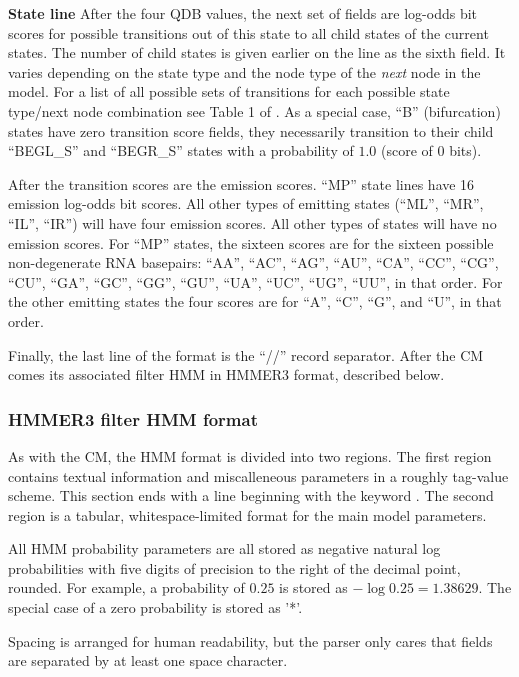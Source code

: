 \begin{sreitems}{\textbf{State line}}
  After the four QDB values, the next set of fields are log-odds bit
  scores for possible transitions out of this state to all child
  states of the current states. The number of child states is given
  earlier on the line as the sixth field. It varies depending on the
  state type and the node type of the \emph{next} node in the model.
  For a list of all possible sets of transitions for each possible
  state type/next node combination see Table 1 of
  \citep{NawrockiEddy07}. As a special case, ``B'' (bifurcation) states
  have zero transition score fields, they necessarily transition to
  their child ``BEGL\_S'' and ``BEGR\_S'' states with a probability of
  $1.0$ (score of $0$ bits).

  After the transition scores are the emission scores. 
  ``MP'' state lines have 16 emission log-odds bit scores. All other
  types of emitting states (``ML'', ``MR'', ``IL'', ``IR'') will have
  four emission scores. All other types of states will have no
  emission scores. For ``MP'' states, the sixteen scores are for the
  sixteen possible non-degenerate RNA basepairs: ``AA'', ``AC'',
  ``AG'', ``AU'', ``CA'', ``CC'', ``CG'', ``CU'', ``GA'', ``GC'',
  ``GG'', ``GU'', ``UA'', ``UC'', ``UG'', ``UU'', in that order. 
  For the other emitting states the four scores are for ``A'', ``C'',
  ``G'', and ``U'', in that order.
\end{sreitems}

  Finally, the last line of the format is the ``//'' record separator.
  After the CM comes its associated filter HMM in HMMER3 format,
  described below.

\subsubsection{HMMER3 filter HMM format}

As with the CM, the HMM format is divided into two regions. The first
region contains textual information and miscalleneous parameters in a
roughly tag-value scheme.  This section ends with a line beginning
with the keyword . The second region is a tabular,
whitespace-limited format for the main model parameters.

All HMM probability parameters are all stored as negative natural log
probabilities with five digits of precision to the right of the
decimal point, rounded. For example, a probability of $0.25$ is stored
as $-\log 0.25 = 1.38629$. The special case of a zero probability is
stored as '*'.

Spacing is arranged for human readability, but the parser only cares
that fields are separated by at least one space character.

